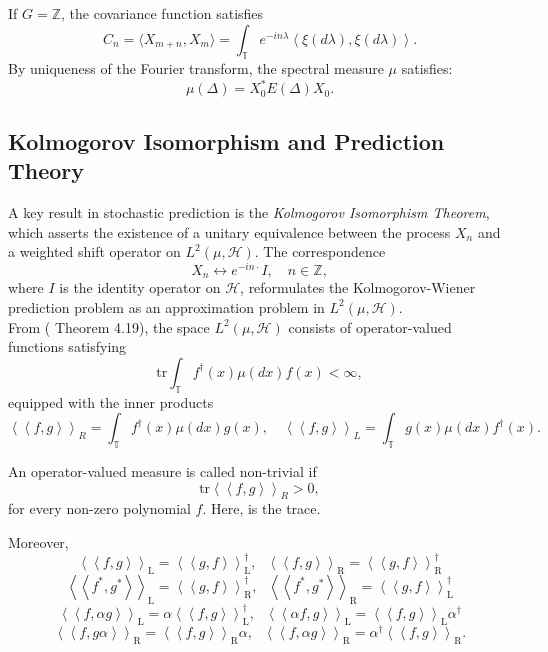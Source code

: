 \documentclass[11pt]{article}
\begin{document}
If $ G = \mathbb{Z} $, the covariance function satisfies
\[
 C_n = \langle X_{m+n}, X_m \rangle = \int_{\mathbb{T}} e^{-in\lambda} \left\langle \xi(d\lambda), \xi(d\lambda) \right\rangle.
\]
By uniqueness of the Fourier transform, the spectral measure $ \mu $ satisfies:
\[
 \mu(\Delta) = X_0^* E(\Delta) X_0.
\]

\subsection{Kolmogorov Isomorphism and Prediction Theory}

A key result in stochastic prediction is the \textit{Kolmogorov Isomorphism Theorem}, which asserts the existence of a unitary equivalence between the process $ X_n $ and a weighted shift operator on $ L^2(\mu, \mathcal{H}) $. The correspondence
\[
 X_n \leftrightarrow e^{-in\cdot} I, \quad n\in \mathbb{Z},
\]
where $ I $ is the identity operator on $ \mathcal{H} $, reformulates the Kolmogorov-Wiener prediction problem as an approximation problem in $ L^2(\mu, \mathcal{H}) $.\\

From (\cite{ManS} Theorem 4.19), the space $ L^2(\mu, \mathcal{H}) $ consists of operator-valued functions satisfying
\[
 \text{tr}  \int_{\mathbb{T}} f^\dagger(x) \mu(dx) f(x)  < \infty,
\]
equipped with the inner products
\[
 \left\langle \left\langle f, g \right\rangle \right\rangle_R = \int_{\mathbb{T}} f^\dagger(x) \mu(dx) g(x), \quad \left\langle \left\langle f, g \right\rangle \right\rangle_L = \int_{\mathbb{T}} g(x) \mu(dx) f^\dagger(x).
\]

\noindent An operator-valued measure is called non-trivial if $$\text{tr} \left\langle \left\langle f, g \right\rangle \right\rangle_R >0,$$ for every non-zero polynomial $f$. Here,  is the trace.

\noindent Moreover, 
$$\left\langle \left\langle f, g \right\rangle \right\rangle_\mathrm{L} = \left\langle \left\langle g, f \right\rangle \right\rangle_\mathrm{L}^{\dag}, ~~~
\left\langle \left\langle f, g \right\rangle \right\rangle_\mathrm{R} = \left\langle \left\langle g, f \right\rangle \right\rangle_\mathrm{R}^{\dag}$$
$$\left\langle \left\langle f^{*}, g^{*} \right\rangle \right\rangle_\mathrm{L} = \left\langle \left\langle g, f \right\rangle \right\rangle_\mathrm{R}^{\dag}, ~~~
\left\langle \left\langle f^{*}, g^{*} \right\rangle \right\rangle_\mathrm{R} = \left\langle \left\langle g, f \right\rangle \right\rangle_\mathrm{L}^{\dag}$$
$$\left\langle \left\langle f, \alpha g \right\rangle \right\rangle_\mathrm{L} = \alpha \left\langle \left\langle f, g \right\rangle \right\rangle_\mathrm{L}^{\dag}, ~~~
\left\langle \left\langle \alpha f, g \right\rangle \right\rangle_\mathrm{L} = \left\langle \left\langle f, g \right\rangle \right\rangle_\mathrm{L} \alpha ^{\dag}$$
$$\left\langle \left\langle f, g \alpha \right\rangle \right\rangle_\mathrm{R} = \left\langle \left\langle f, g \right\rangle \right\rangle_\mathrm{R}\alpha, ~~~
\left\langle \left\langle f, \alpha g \right\rangle \right\rangle_\mathrm{R} = \alpha^{\dag} \left\langle \left\langle f, g \right\rangle \right\rangle_\mathrm{R}.$$
\end{document}
